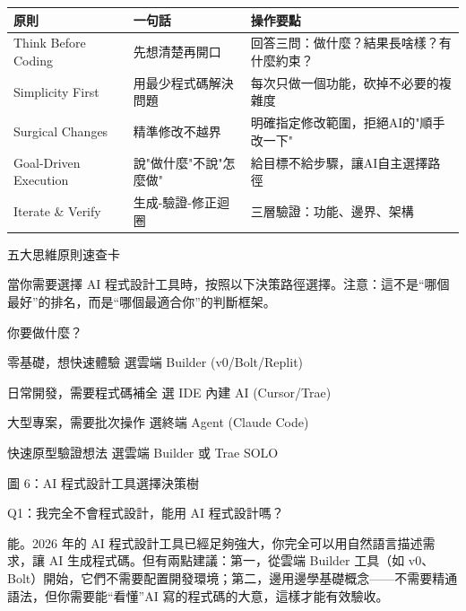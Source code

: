 


\begin{center}
\begin{tabularx}{\linewidth}{|X|X|X|}
\hline
\textbf{原則} & \textbf{一句話} & \textbf{操作要點} \tabularnewline
\hline
Think Before Coding & 先想清楚再開口 & 回答三問：做什麼？結果長啥樣？有什麼約束？ \tabularnewline
Simplicity First & 用最少程式碼解決問題 & 每次只做一個功能，砍掉不必要的複雜度 \tabularnewline
Surgical Changes & 精準修改不越界 & 明確指定修改範圍，拒絕AI的"順手改一下" \tabularnewline
Goal-Driven Execution & 說"做什麼"不說"怎麼做" & 給目標不給步驟，讓AI自主選擇路徑 \tabularnewline
Iterate \& Verify & 生成-驗證-修正迴圈 & 三層驗證：功能、邊界、架構 \tabularnewline
\hline
\end{tabularx}
\end{center}

\begin{center}\small\color{gray}五大思維原則速查卡\end{center}


當你需要選擇 AI 程式設計工具時，按照以下決策路徑選擇。注意：這不是“哪個最好”的排名，而是“哪個最適合你”的判斷框架。

你要做什麼？

零基礎，想快速體驗 選雲端 Builder (v0/Bolt/Replit)

日常開發，需要程式碼補全 選 IDE 內建 AI (Cursor/Trae)

大型專案，需要批次操作 選終端 Agent (Claude Code)

快速原型驗證想法 選雲端 Builder 或 Trae SOLO

\begin{center}\small\color{gray}圖 6：AI 程式設計工具選擇決策樹\end{center}


Q1：我完全不會程式設計，能用 AI 程式設計嗎？

能。2026 年的 AI 程式設計工具已經足夠強大，你完全可以用自然語言描述需求，讓 AI 生成程式碼。但有兩點建議：第一，從雲端 Builder 工具（如 v0、Bolt）開始，它們不需要配置開發環境；第二，邊用邊學基礎概念——不需要精通語法，但你需要能“看懂”AI 寫的程式碼的大意，這樣才能有效驗收。

